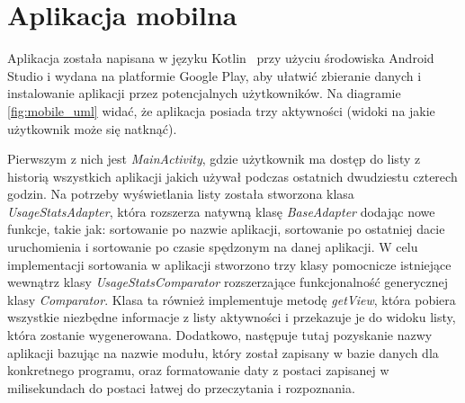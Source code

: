 \documentclass[a4paper,twoside,12pt]{book}
\begin{document}
\section{Aplikacja mobilna}
\label{mobile}
Aplikacja została napisana w języku Kotlin~\cite{kotlinvsjava} przy użyciu środowiska Android Studio i wydana na platformie Google Play, aby ułatwić zbieranie danych i instalowanie aplikacji przez potencjalnych użytkowników.
Na diagramie \ref{fig:mobile_uml} widać, że aplikacja posiada trzy aktywności (widoki na jakie użytkownik może się natknąć). 

Pierwszym z nich jest \textit{MainActivity}, gdzie użytkownik ma dostęp do listy z historią wszystkich aplikacji jakich używał podczas ostatnich dwudziestu czterech godzin. Na potrzeby wyświetlania listy została stworzona klasa \textit{UsageStatsAdapter}, która rozszerza natywną klasę \textit{BaseAdapter} dodając nowe funkcje, takie jak: sortowanie po nazwie aplikacji, sortowanie po ostatniej dacie uruchomienia i sortowanie po czasie spędzonym na danej aplikacji. W celu implementacji sortowania w aplikacji stworzono trzy klasy pomocnicze istniejące wewnątrz klasy \textit{UsageStatsComparator} rozszerzające funkcjonalność generycznej klasy \textit{Comparator}. Klasa ta również implementuje metodę \textit{getView}, która pobiera wszystkie niezbędne informacje z listy aktywności i przekazuje je do widoku listy, która zostanie wygenerowana. Dodatkowo, następuje tutaj pozyskanie nazwy aplikacji bazując na nazwie modułu, który został zapisany w bazie danych dla konkretnego programu, oraz formatowanie daty z postaci zapisanej w milisekundach do postaci łatwej do przeczytania i rozpoznania. 
\end{document}
